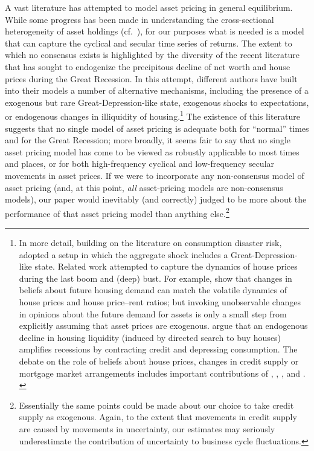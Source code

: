 A vast literature has attempted to model asset pricing in general equilibrium.  While some progress has been made in understanding the cross-sectional heterogeneity of asset holdings (cf.\ \cite{gmAssetPricing}), for our purposes what is needed is a model that can capture the cyclical and secular time series of returns.  The extent to which no consensus exists is highlighted by the diversity of the recent literature that has sought to endogenize the precipitous decline of net worth and house prices during the Great Recession.  In this attempt, different authors have built into their models a number of alternative mechanisms, including the presence of a exogenous but rare Great-Depression-like state, exogenous shocks to expectations, or endogenous changes in illiquidity of housing.\footnote{In more detail, building on the literature on consumption disaster risk, \cite{glover:intergenRedistr} adopted a setup in which the aggregate shock includes a Great-Depression-like state. Related work attempted to capture the dynamics of house prices during the last boom and (deep) bust. For example, \cite{kmv:houseBoomBust} show that changes in beliefs about future housing demand can match the volatile dynamics of house prices and house price--rent ratios; but invoking unobservable changes in opinions about the future demand for assets is only a small step from explicitly assuming that asset prices are exogenous. \cite{garrigaHedlund} argue that an endogenous decline in housing liquidity (induced by directed search to buy houses) amplifies recessions by contracting credit and depressing consumption.  The debate on the role of beliefs about house prices, changes in credit supply or mortgage market arrangements includes important contributions of \cite{favilukis:housing}, \cite{kmv:houseBoomBust}, \cite{justPrimTamb:CredSupplyAndHouseBoom}, and \cite{garrigaHedlund}. \label{foot_housingLit}}  The existence of this literature suggests that no single model of asset pricing is adequate both for ``normal'' times and for the Great Recession; more broadly, it seems fair to say that no single asset pricing model has come to be viewed as robustly applicable to most times and places, or for both high-frequency cyclical and low-frequency secular movements in asset prices.  If we were to incorporate any non-consensus model of asset pricing (and, at this point, \textit{all} asset-pricing models are non-consensus models), our paper would inevitably (and correctly) judged to be more about the performance of that asset pricing model than anything else.\footnote{Essentially the same points could be made about our choice to take credit supply as exogenous.  Again, to the extent that movements in credit supply are caused by movements in uncertainty, our estimates may seriously underestimate the contribution of uncertainty to business cycle fluctuations.}

